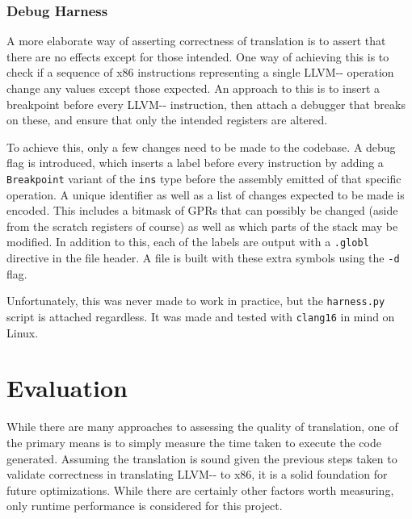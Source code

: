 \documentclass{article}
\begin{document}
\subsubsection{Debug Harness}

A more elaborate way of asserting correctness of translation is to assert that there are no effects except for those intended. One way of achieving this is to check if a sequence of x86 instructions representing a single LLVM-{}- operation change any values except those expected.  An approach to this is to insert a breakpoint before every LLVM-{}- instruction, then attach a debugger that breaks on these,  and ensure that only the intended registers are altered.

To achieve this, only a few changes need to be made to the codebase. A debug flag is introduced, which inserts a label before every instruction by adding a \lstinline!Breakpoint! variant of the \lstinline!ins! type before the assembly emitted of that specific operation. A unique identifier as well as a list of changes expected to be made is encoded. 
This includes a bitmask of GPRs that can possibly be changed (aside from the scratch registers of course) as well as which parts of the stack may be modified. %
In addition to this, each of the labels are output with a \lstinline!.globl! directive in the file header. A file is built with these extra symbols using the \lstinline!-d! flag.

Unfortunately, this was never made to work in practice, but the \texttt{harness.py} script is attached regardless. It was made and tested with \texttt{clang16} in mind on Linux.










\section{Evaluation}

While there are many approaches to assessing the quality of translation, one of the primary means is to simply measure the time taken to execute the code generated. 
Assuming the translation is sound given the previous steps taken to validate correctness in translating LLVM-{}- to x86, it is a solid foundation for future optimizations. While there are certainly other factors worth measuring, only runtime performance is considered for this project. %
\end{document}

